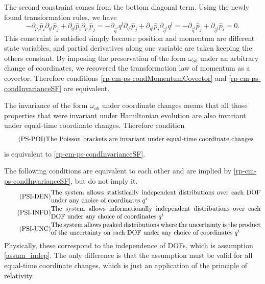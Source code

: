 The second constraint comes from the bottom diagonal term. Using the newly found transformation rules, we have
\begin{equation}
	- \partial_{p_l} \hat{p}_i \partial_{q^l} \hat{p}_j +  \partial_{q^l} \hat{p}_i \partial_{p_l} \hat{p}_j = - \partial_{\hat{q}^i} q^l \partial_{q^l} \hat{p}_j +  \partial_{q^l} \hat{p}_i \partial_{\hat{q}^j} q^l = - \partial_{\hat{q}^i} \hat{p}_j + \partial_{\hat{q}^j} \hat{p}_i = 0.
\end{equation}
This constraint is satisfied simply because position and momentum are different state variables, and partial derivatives along one variable are taken keeping the others constant. By imposing the preservation of the form $\omega_{ab}$ under an arbitrary change of coordinates, we recovered the transformation law of momentum as a covector. Therefore conditions \ref{rp-cm-ps-condMomentumCovector} and \ref{rp-cm-ps-condInvarianceSF} are equivalent.

The invariance of the form $\omega_{ab}$ under coordinate changes means that all those properties that were invariant under Hamiltonian evolution are also invariant under equal-time coordinate changes. Therefore condition
\begin{equation}
	\tag{PS-POI}\label{rp-cm-ps-condInvariancePoisson}
	\eqtext{The Poisson brackets are invariant under equal-time coordinate changes} \\
\end{equation}
is equivalent to \ref{rp-cm-ps-condInvarianceSF}.

The following conditions are equivalent to each other and are implied by \ref{rp-cm-ps-condInvarianceSF}, but do not imply it.
\begin{align}
	\tag{PSI-DEN}\label{rp-cm-ps-condInvarianceIndepDensities}
	&\eqtext{The system allows statistically independent distributions over each DOF under any choice of coordinates $q^i$} \\
	\tag{PSI-INFO}\label{rp-cm-ps-condInvarianceIndepEntropy}
	&\eqtext{The system allows informationally independent distributions over each DOF under any choice of coordinates $q^i$} \\
	\tag{PSI-UNC}\label{rp-cm-ps-condInvarianceIndepUncertainty}
	&\eqtext{The system allows peaked distributions where the uncertainty is the product of the uncertainty on each DOF under any choice of coordinates $q^i$}
\end{align}
Physically, these correspond to the independence of DOFs, which is assumption \ref{assum_indep}. The only difference is that the assumption must be valid for all equal-time coordinate changes, which is just an application of the principle of relativity.

